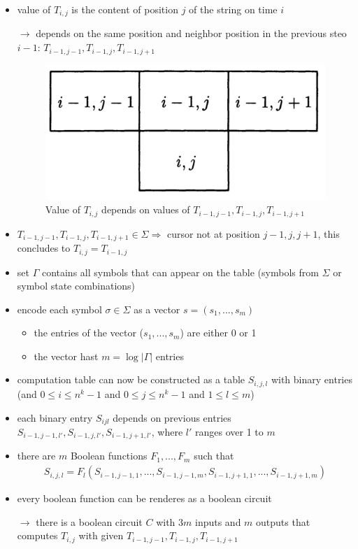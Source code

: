 \documentclass[a4]{scrartcl}
\begin{document}
\begin{itemize}
\item value of $T_{i,j}$ is the content of position $j$ of the string on time $i$
\item[$\rightarrow$] depends on the same position and neighbor position in the previous steo $i-1$: $T_{i-1,j-1}, T_{i-1,j}, T_{i-1,j+1}$
\item[] \begin{figure}[H]
\begin{center}
\includegraphics[scale=0.3]{depends.jpg}
\end{center}
\caption{Value of $T_{i,j}$ depends on values of $T_{i-1,j-1}, T_{i-1,j}, T_{i-1,j+1}$}
\end{figure}
\item $T_{i-1,j-1}, T_{i-1,j}, T_{i-1,j+1} \in \Sigma \Rightarrow$ cursor not at position $j-1, j, j+1$, this concludes to $T_{i,j}=T_{i-1,j}$ \\
\item set $\Gamma$ contains all symbols that can appear on the table (symbols from $\Sigma$ or symbol state combinations)
\item encode each symbol $\sigma \in \Sigma$ as a vector $s=(s_1,...,s_m)$ 
\begin{itemize}
\item the entries of the vector ($s_1,...,s_m$) are either 0 or 1
\item the vector hast $m=\log |\Gamma|$ entries
\end{itemize}
\item computation table can now be constructed as a table $S_{i,j,l}$ with binary entries (and $0 \leq i \leq n^k -1$ and $0 \leq j \leq n^k -1$ and $1 \leq l \leq m$)
\item each binary entry $S_{ijl}$ depends on previous entries $S_{i-1,j-1,l'}, S_{i-1,j,l'}, S_{i-1,j+1,l'}$, where $l'$ ranges over 1 to $m$
\item there are $m$ Boolean functions $F_1,...,F_m$ such that
\begin{align*}
S_{i,j,l}=F_l(S_{i-1,j-1,1},..., S_{i-1,j-1,m}, S_{i-1,j+1,1},...,S_{i-1,j+1,m})
\end{align*}
\item every boolean function can be renderes as a boolean circuit
\item[$\rightarrow$] there is a boolean circuit $C$ with $3m$ inputs and $m$ outputs that computes $T_{i,j}$ with given $T_{i-1,j-1}, T_{i-1,j}, T_{i-1,j+1}$ \\


\end{itemize}
\end{document}
